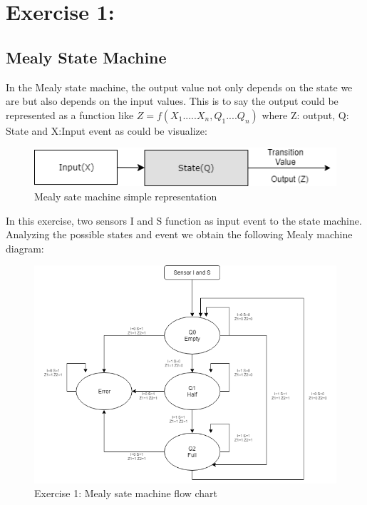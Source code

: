 



%
%
%

\section{\color{olive}Exercise 1: }

\subsection{\color{purple}Mealy State Machine}

In the Mealy state machine, the output value not only depends on the state we are but also depends on the input values. This is to say the output could be represented as a function like $Z=f(X_1.....X_n,Q_1....Q_n)$ where Z: output, Q: State and X:Input event as could be visualize:

 \begin{figure}[h!]
        \centering
        \includegraphics[scale=0.75]{Mealydiagram.png}
        \caption{\color{cyan}Mealy sate machine simple representation}
        \label{fig:ej1mealyr}
    \end{figure}

In this exercise, two sensors I and S function as input event to the state machine. Analyzing the possible states and event we obtain the following Mealy machine diagram:

 \begin{figure}[h!]
        \centering
        \includegraphics[scale=0.65]{ej1mealy.png}
        \caption{\color{cyan}Exercise 1: Mealy sate machine flow chart}
        \label{fig:ej1mealyd}
    \end{figure}

